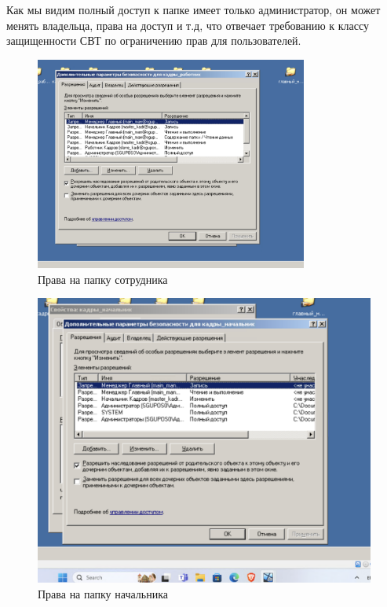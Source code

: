 Как мы видим полный доступ к папке имеет только администратор, он может менять владельца, права на доступ и т.д,
 что отвечает требованию к классу защищенности СВТ по ограничению прав для пользователей.
\begin{figure}[H]
    \centering
    \includegraphics[width=0.8\textwidth]{pict/prac/9}
    \caption{Права на папку сотрудника}
    \label{fig:21}
\end{figure}

\begin{figure}[H]
  \centering
  \includegraphics[width=1\textwidth]{pict/prac/10}
  \caption{Права на папку начальника}
  \label{fig:22}
\end{figure}

